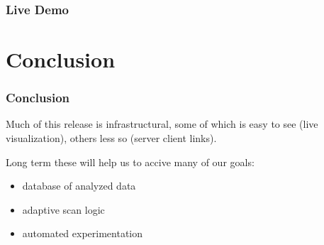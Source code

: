 \documentclass{beamer}
\begin{document}
\begin{frame}
\frametitle{Live Demo}
\end{frame}

\section{Conclusion}
\begin{frame}
\frametitle{Conclusion}
Much of this release is infrastructural, some of which is easy to see
(live visualization), others less so (server client links).

Long term these will help us to accive many of our goals:
\begin{itemize}
\item database of analyzed data
\item adaptive scan logic
\item automated experimentation
\end{itemize}
\end{frame}
\end{document}

